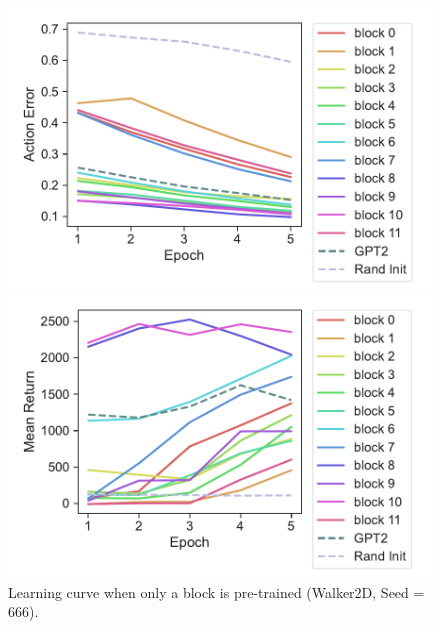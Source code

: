 \documentclass{article}
\begin{document}
\begin{figure}[H]
    \centering
    \begin{minipage}[b]{0.48\linewidth}
        \includegraphics[width=\linewidth]{figs/actionerror_block_gpt2_dt_K1_walker2d_medium_666.pdf}
    \end{minipage}
    \begin{minipage}[b]{0.48\linewidth}
        \includegraphics[width=\linewidth]{figs/returnmean_block_gpt2_dt_K1_walker2d_medium_666.pdf}
    \end{minipage}
    \caption{Learning curve when only a block is pre-trained (Walker2D, Seed = 666).}
    \label{fig:learning_curve_walker2d}
\end{figure}
\end{document}
